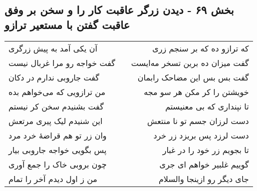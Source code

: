 \begin{center}
\section*{بخش ۶۹ - دیدن زرگر عاقبت کار را و سخن بر وفق عاقبت گفتن با مستعیر ترازو}
\label{sec:sh069}
\begin{longtable}{l p{0.5cm} r}
آن یکی آمد به پیش زرگری
&&
که ترازو ده که بر سنجم زری
\\
گفت خواجه رو مرا غربال نیست
&&
گفت میزان ده برین تسخر مه‌ایست
\\
گفت جاروبی ندارم در دکان
&&
گفت بس بس این مضاحک رابمان
\\
من ترازویی که می‌خواهم بده
&&
خویشتن را کر مکن هر سو مجه
\\
گفت بشنیدم سخن کر نیستم
&&
تا نپنداری که بی معنیستم
\\
این شنیدم لیک پیری مرتعش
&&
دست لرزان جسم تو نا منتعش
\\
وان زر تو هم قراضهٔ خرد مرد
&&
دست لرزد پس بریزد زر خرد
\\
پس بگویی خواجه جاروبی بیار
&&
تا بجویم زر خود را در غبار
\\
چون بروبی خاک را جمع آوری
&&
گوییم غلبیر خواهم ای جری
\\
من ز اول دیدم آخر را تمام
&&
جای دیگر رو ازینجا والسلام
\\
\end{longtable}
\end{center}
